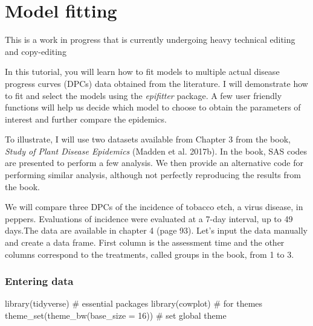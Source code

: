 \documentclass[
  letterpaper,
  DIV=11,
  numbers=noendperiod]{scrreprt}
\newenvironment{Shaded}{\begin{snugshade}}{\end{snugshade}}
\newcommand{\AttributeTok}[1]{\textcolor[rgb]{0.40,0.45,0.13}{#1}}
\newcommand{\CommentTok}[1]{\textcolor[rgb]{0.37,0.37,0.37}{#1}}
\newcommand{\DecValTok}[1]{\textcolor[rgb]{0.68,0.00,0.00}{#1}}
\newcommand{\FunctionTok}[1]{\textcolor[rgb]{0.28,0.35,0.67}{#1}}
\newcommand{\NormalTok}[1]{\textcolor[rgb]{0.00,0.23,0.31}{#1}}
\begin{document}
\hypertarget{model-fitting}{%
\chapter{Model fitting}\label{model-fitting}}

\begin{tcolorbox}[enhanced jigsaw, rightrule=.15mm, left=2mm, breakable, colframe=quarto-callout-note-color-frame, toprule=.15mm, leftrule=.75mm, bottomrule=.15mm, colback=white, arc=.35mm, opacityback=0]
\begin{minipage}[t]{5.5mm}
\textcolor{quarto-callout-note-color}{\faInfo}
\end{minipage}%
\begin{minipage}[t]{\textwidth - 5.5mm}
This is a work in progress that is currently undergoing heavy technical
editing and copy-editing\end{minipage}%
\end{tcolorbox}

In this tutorial, you will learn how to fit models to multiple actual
disease progress curves (DPCs) data obtained from the literature. I will
demonstrate how to fit and select the models using the \emph{epifitter}
package. A few user friendly functions will help us decide which model
to choose to obtain the parameters of interest and further compare the
epidemics.

To illustrate, I will use two datasets available from Chapter 3 from the
book, \emph{Study of Plant Disease Epidemics} (Madden et al. 2017b). In
the book, SAS codes are presented to perform a few analysis. We then
provide an alternative code for performing similar analysis, although
not perfectly reproducing the results from the book.

We will compare three DPCs of the incidence of tobacco etch, a virus
disease, in peppers. Evaluations of incidence were evaluated at a 7-day
interval, up to 49 days.The data are available in chapter 4 (page 93).
Let's input the data manually and create a data frame. First column is
the assessment time and the other columns correspond to the treatments,
called groups in the book, from 1 to 3.

\hypertarget{entering-data}{%
\subsection{Entering data}\label{entering-data}}

\begin{Shaded}
\begin{Highlighting}[]
\FunctionTok{library}\NormalTok{(tidyverse) }\CommentTok{\# essential packages }
\FunctionTok{library}\NormalTok{(cowplot) }\CommentTok{\# for themes }
\FunctionTok{theme\_set}\NormalTok{(}\FunctionTok{theme\_bw}\NormalTok{(}\AttributeTok{base\_size =} \DecValTok{16}\NormalTok{)) }\CommentTok{\# set global theme}
\end{Highlighting}
\end{Shaded}
\end{document}
